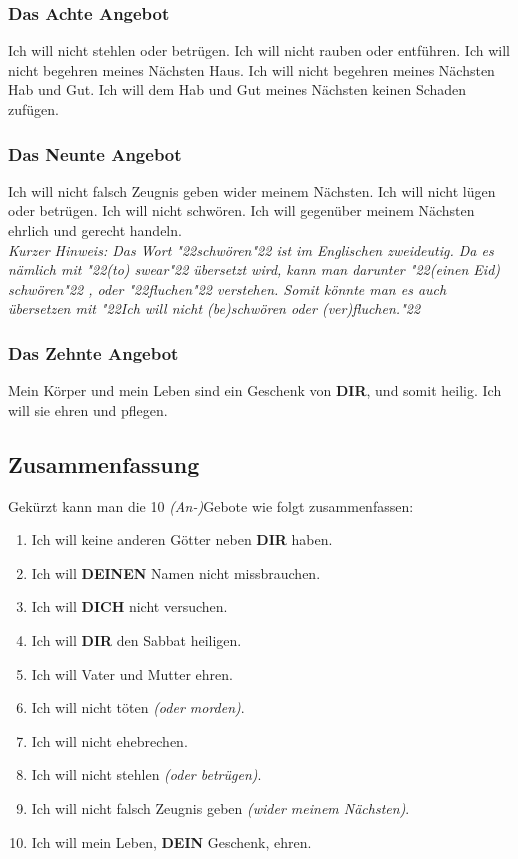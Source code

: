 \documentclass[12pt,a4paper]{article}
\newcommand{\Deinen}[0]{\textbf{DEINEN}}
\newcommand{\Dein}[0]{\textbf{DEIN}}
\newcommand{\Dich}[0]{\textbf{DICH}}
\newcommand{\Dir}[0]{\textbf{DIR}}
\newcommand{\q}[1]{\char"22{#1}\char"22 }
\begin{document}
	\subsubsection{Das Achte Angebot}
		Ich will nicht stehlen oder betr\"ugen.
		Ich will nicht rauben oder entf\"uhren.
		Ich will nicht begehren meines N\"achsten Haus.
		Ich will nicht begehren meines N\"achsten Hab und Gut.
		Ich will dem Hab und Gut meines N\"achsten keinen Schaden zuf\"ugen.
		
	\subsubsection{Das Neunte Angebot} \label{DasNeunteAngebot}
		Ich will nicht falsch Zeugnis geben wider meinem N\"achsten.
		Ich will nicht l\"ugen oder betr\"ugen.
		Ich will nicht schw\"oren.
		Ich will gegen\"uber meinem N\"achsten ehrlich und gerecht handeln.
		\\
		\textit{Kurzer Hinweis:
		Das Wort \q{schw\"oren} ist im Englischen zweideutig.
		Da es n\"amlich mit \q{(to) swear} \"ubersetzt wird,
		kann man darunter \q{(einen Eid) schw\"oren},
		oder \q{fluchen} verstehen.
		Somit k\"onnte man es auch \"ubersetzen mit
		\q{Ich will nicht (be)schw\"oren oder (ver)fluchen.}}
		
	\subsubsection{Das Zehnte Angebot} \label{DasZehnteAngebot}
		Mein K\"orper und mein Leben sind ein Geschenk von {\Dir},
		und somit heilig.
		Ich will sie ehren und pflegen.

	\subsection{Zusammenfassung}
		Gek\"urzt kann man die 10 \textit{(An-)}Gebote wie folgt zusammenfassen:
		\\
		\begin{enumerate}[nosep]
			\item Ich will keine anderen G\"otter neben {\Dir} haben.
			\item Ich will {\Deinen} Namen nicht missbrauchen.
			\item Ich will {\Dich} nicht versuchen.
			\item Ich will {\Dir} den Sabbat heiligen.
			\item Ich will Vater und Mutter ehren.
			\item Ich will nicht t\"oten \textit{(oder morden)}.
			\item Ich will nicht ehebrechen.
			\item Ich will nicht stehlen \textit{(oder betr\"ugen)}.
			\item Ich will nicht falsch Zeugnis geben \textit{(wider meinem N\"achsten)}.
			\item Ich will mein Leben, {\Dein} Geschenk, ehren.
		\end{enumerate}
	
\end{document}
